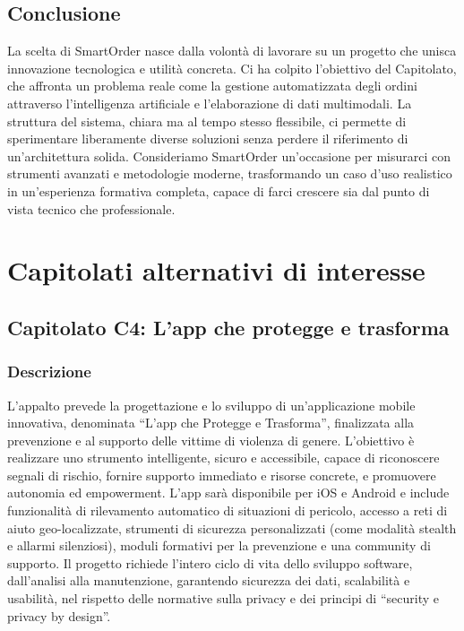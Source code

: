 \documentclass[a4paper,12pt]{article}
\begin{document}
\subsection{Conclusione}
La scelta di SmartOrder nasce dalla volontà di lavorare su un progetto che unisca innovazione tecnologica e utilità concreta. Ci ha colpito l’obiettivo del Capitolato, che affronta un problema reale come la gestione automatizzata degli ordini attraverso l’intelligenza artificiale e l’elaborazione di dati multimodali. La struttura del sistema, chiara ma al tempo stesso flessibile, ci permette di sperimentare liberamente diverse soluzioni senza perdere il riferimento di un’architettura solida. Consideriamo SmartOrder un’occasione per misurarci con strumenti avanzati e metodologie moderne, trasformando un caso d’uso realistico in un’esperienza formativa completa, capace di farci crescere sia dal punto di vista tecnico che professionale.

\section{Capitolati alternativi di interesse}

\subsection{Capitolato C4: L’app che protegge e trasforma}

\subsubsection{Descrizione}
L’appalto prevede la progettazione e lo sviluppo di un’applicazione mobile innovativa, denominata “L’app che Protegge e Trasforma”, finalizzata alla prevenzione e al supporto delle vittime di violenza di genere. L’obiettivo è realizzare uno strumento intelligente, sicuro e accessibile, capace di riconoscere segnali di rischio, fornire supporto immediato e risorse concrete, e promuovere autonomia ed empowerment.
L’app sarà disponibile per iOS e Android e include funzionalità di rilevamento automatico di situazioni di pericolo, accesso a reti di aiuto geo-localizzate, strumenti di sicurezza personalizzati (come modalità stealth e allarmi silenziosi), moduli formativi per la prevenzione e una community di supporto.
Il progetto richiede l’intero ciclo di vita dello sviluppo software, dall’analisi alla manutenzione, garantendo sicurezza dei dati, scalabilità e usabilità, nel rispetto delle normative sulla privacy e dei principi di “security e privacy by design”.
\end{document}
